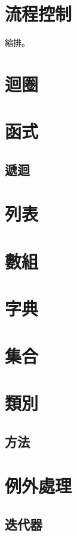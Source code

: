 \documentclass[a4paper,12pt]{book}
\theoremstyle{definition}
\begin{document}
\chapter{流程控制}
%
\label{c:flow}

縮排。

\chapter{迴圈}
%
\label{c:loop}

\chapter{函式}
%
\label{c:function}

\section{遞迴}

\chapter{列表}
%
\label{c:list}

\chapter{數組}
%
\label{c:tuple}

\chapter{字典}
%
\label{c:dict}

\chapter{集合}
%
\label{c:set}

\chapter{類別}
%
\label{c:class}

\section{方法}

\chapter{例外處理}
%
\label{c:exception}

\section{迭代器}
\end{document}
